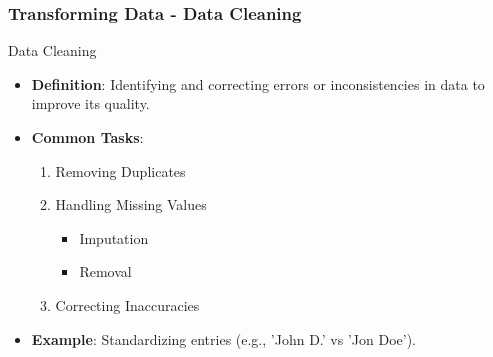 \documentclass[aspectratio=169]{beamer}
\begin{document}
\begin{frame}[fragile]
    \frametitle{Transforming Data - Data Cleaning}
    \begin{block}{Data Cleaning}
        \begin{itemize}
            \item \textbf{Definition}: Identifying and correcting errors or inconsistencies in data to improve its quality.
            \item \textbf{Common Tasks}:
            \begin{enumerate}
                \item Removing Duplicates
                \item Handling Missing Values
                \begin{itemize}
                    \item Imputation
                    \item Removal
                \end{itemize}
                \item Correcting Inaccuracies
            \end{enumerate}
            \item \textbf{Example}: Standardizing entries (e.g., 'John D.' vs 'Jon Doe').
        \end{itemize}
    \end{block}
\end{frame}
\end{document}
